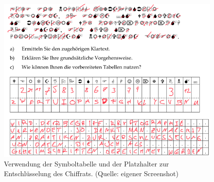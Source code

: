 \begin{figure}
    \centering
    \includegraphics[scale=0.5]{aufgabe 1/img/decode}
    \caption{Verwendung der Symboltabelle und der Platzhalter zur Entschlüsselung des Chiffrats.  (Quelle: eigener Screenshot)}
    \label{fig:decode}
\end{figure}



